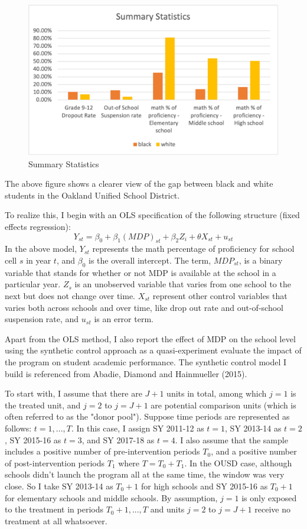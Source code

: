\begin{figure}[H]
  \includegraphics[width=\linewidth]{Picture1.png}
  \caption{Summary Statistics}
  \label{fig:boat1}
\end{figure}

The above figure shows a clearer view of the gap between black and white students in the Oakland Unified School District.

\noindent To realize this, I begin with an OLS specification of the following structure (fixed effects regression):
\[
Y_{st}=\beta_{0}+\beta_1(MDP)_{st}+\beta_2 Z_i+\theta X_{st}+u_{st}
\]
\noindent In the above model, $Y_{st}$ represents the math percentage of proficiency for school cell $s$ in year $t$, and $\beta_{0}$ is the overall intercept. The term, $MDP_{st}$, is a binary variable that stands for whether or not MDP is available at the school in a particular year. $Z_s$ is an unobserved variable that varies from one school to the next but does not change over time. $X_{st}$ represent other control variables that varies both across schools and over time, like drop out rate and out-of-school suspension rate, and $u_{st}$ is an error term.

\noindent Apart from the OLS method, I also report the effect of MDP on the school level using the synthetic control approach as a quasi-experiment evaluate the impact of the program on student academic performance. The synthetic control model I build is referenced from Abadie, Diamond and Hainmueller (2015).

\noindent To start with, I assume that there are $J+1$ units in total, among which $j=1$ is the treated unit, and $j=2$ to $j=J+1$ are potential comparison units (which is often referred to as the "donor pool"). Suppose time periods are represented as follows: $t=1,...,T$. In this case, I assign SY 2011-12 as $t=1$, SY 2013-14 as $t=2$, SY 2015-16 as $t=3$, and SY 2017-18 as $t=4$. I also assume that the sample includes a positive number of pre-intervention periods $T_0$, and a positive number of post-intervention periods $T_1$ where $T=T_0+T_1$. In the OUSD case, although schools didn't launch the program all at the same time, the window was very close. So I take SY 2013-14 as $T_0+1$ for high schools and SY 2015-16 as $T_0+1$ for elementary schools and middle schools. By assumption, $j=1$ is only exposed to the treatment in periods $T_0+1,...,T$ and units $j=2$ to $j=J+1$ receive no treatment at all whatsoever. 

